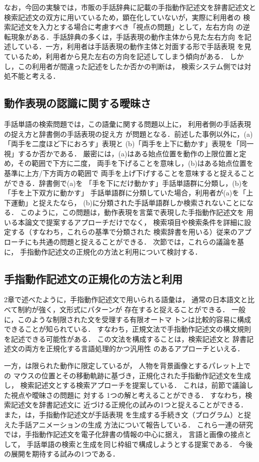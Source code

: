 なお，今回の実験では，市販の手話辞典に記載の手指動作記述文を辞書記述文と
検索記述文の双方に用いているため，顕在化していないが，実際に利用者の
検索記述文を入力とする場合に考慮すべき「視点の問題」として，左右方向
の逆転現象がある．手話辞典の多くは，手話表現の動作主体から見た左右方向
を記述している．一方，利用者は手話表現の動作主体と対面する形で手話表現
を見ているため，利用者から見た左右の方向を記述してしまう傾向がある．
しかし，この利用者が間違った記述をしたか否かの判断は，
検索システム側では対処不能と考える．


\subsection {動作表現の認識に関する曖昧さ}

手話単語の検索問題では，この語彙に関する問題以上に，
利用者側の手話表現の捉え方と辞書側の手話表現の捉え方
が問題となる．前述した事例以外に，(a)「両手を二度ほど下におろす」表現と
(b)「両手を上下に動かす」表現を「同一視」するか否かである．
厳密には，(a)はある始点位置を動作の上限位置と定め，その範囲で下方に二度，
両手を下げることを意味し，(b)はある始点位置を基準に上方/下方両方の範囲で
両手を上げ下げすることを意味すると捉えることができる．辞書側で(a)を
「手を下にだけ動かす」手話単語群に分類し，(b)を「手を上下双方に動かす」
手話単語群に分類していた場合，利用者が(a)を「上下運動」と捉えたなら，
(b)に分類された手話単語群しか検索されないことになる．
このように，この問題は，動作表現を言葉で表現した手指動作記述文を
用いる本論文で提案するアプローチだけでなく，
検索項目や検索条件を詳細に設定する（すなわち，これらの基準で分類された
検索辞書を用いる）従来のアプローチにも共通の問題と捉えることができる．
次節では，これらの議論を基に，
手指動作記述文の正規化の方法と利用について検討する．

\subsection {手指動作記述文の正規化の方法と利用}

2章で述べたように，手指動作記述文で用いられる語彙は，
通常の日本語文と比べて制約が強く，文形式にパターンが
存在すると捉えることができる．
一般に，このような制限された文を受理する有限オートマ
トンは比較的容易に構成できることが知られている．
すなわち，正規文法で手指動作記述文の構文規則を記述できる可能性がある．
この文法を構成することは，検索記述文と
辞書記述文の両方を正規化する言語処理的かつ汎用性
のあるアプローチといえる．

一方，\cite{AdachiHisahiro1998}は限られた動作に限定しているが，
人物を背景画像とするパレット上での
マウスの位置とその移動軌跡に基づき，正規化された手指動作記述文を生成し，
検索記述文とする検索アプローチを提案している．
これは，前節で議論した視点や曖昧さの問題に
対する 1つの解と考えることができる．
すなわち，検索記述文を辞書記述文に
近づける正規化の試みの1つと捉えることができる．
また，\cite{AdachiHisahiro1999}は，手指動作記述文が手話表現
を生成する手続き文（プログラム）と捉えた手話アニメーションの生成
方法について報告している．
これら一連の研究では，手指動作記述文を電子化辞書の情報の中心に据え，
言語と画像の接点として，
手話単語の検索と生成を同じ枠組で構成しようとする提案である．
今後の展開を期待する試みの1つである．


